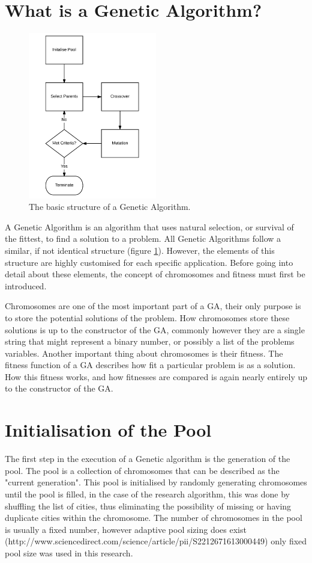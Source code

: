 \section{What is a Genetic Algorithm?}
\par
\begin{figure}[h]
	\centering
		\includegraphics[width=0.5\textwidth]{GA_Structure}
	\caption{The basic structure of a Genetic Algorithm.}
	\label{struct}
\end{figure}
\noindent
A Genetic Algorithm is an algorithm that uses natural selection, or survival of the fittest, to find a solution to a problem. All Genetic Algorithms follow a similar, if not identical structure (figure \ref{struct}). However, the elements of this structure are highly customised for each specific application. Before going into detail about these elements, the concept of chromosomes and fitness must first be introduced.
\par
Chromosomes are one of the most important part of a GA, their only purpose is to store the potential solutions of the problem. How chromosomes store these solutions is up to the constructor of the GA, commonly however they are a single string that might represent a binary number, or possibly a list of the problems variables. Another important thing about chromosomes is their fitness. The fitness function of a GA describes how fit a particular problem is as a solution. How this fitness works, and how fitnesses are compared is again nearly entirely up to the constructor of the GA.


\section{Initialisation of the Pool}
\par
The first step in the execution of a Genetic algorithm is the generation of the pool. The pool is a collection of chromosomes that can be described as the "current generation". This pool is initialised by randomly generating chromosomes until the pool is filled, in the case of the research algorithm, this was done by shuffling the list of cities, thus eliminating the possibility of missing or having duplicate cities within the chromosome. The number of chromosomes in the pool is usually a fixed number, however adaptive pool sizing does exist (http://www.sciencedirect.com/science/article/pii/S2212671613000449) only fixed pool size was used in this research. 
